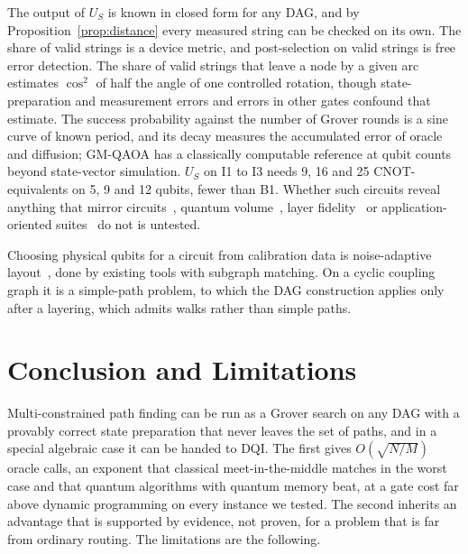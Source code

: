 \documentclass[journal]{IEEEtran}
\begin{document}
The output of $U_{S}$ is known in closed form for any DAG, and by Proposition~\ref{prop:distance} every measured string can be checked on its own. The share of valid strings is a device metric, and post-selection on valid strings is free error detection. The share of valid strings that leave a node by a given arc estimates $\cos^{2}$ of half the angle of one controlled rotation, though state-preparation and measurement errors and errors in other gates confound that estimate. The success probability against the number of Grover rounds is a sine curve of known period, and its decay measures the accumulated error of oracle and diffusion; GM-QAOA has a classically computable reference at qubit counts beyond state-vector simulation. $U_{S}$ on I1 to I3 needs 9, 16 and 25 CNOT-equivalents on 5, 9 and 12 qubits, fewer than B1. Whether such circuits reveal anything that mirror circuits~\cite{proctor2022}, quantum volume~\cite{cross2019}, layer fidelity~\cite{mckay2023} or application-oriented suites~\cite{lubinski2023} do not is untested.

Choosing physical qubits for a circuit from calibration data is noise-adaptive layout~\cite{murali2019,tannu2019,nation2023}, done by existing tools with subgraph matching. On a cyclic coupling graph it is a simple-path problem, to which the DAG construction applies only after a layering, which admits walks rather than simple paths.
\fi

\section{Conclusion and Limitations}
\label{sec:limits}

Multi-constrained path finding can be run as a Grover search on any DAG with a provably correct state preparation that never leaves the set of paths, and in a special algebraic case it can be handed to DQI. The first gives $O(\sqrt{N/M})$ oracle calls, an exponent that classical meet-in-the-middle matches in the worst case and that quantum algorithms with quantum memory beat, at a gate cost far above dynamic programming on every instance we tested. The second inherits an advantage that is supported by evidence, not proven, for a problem that is far from ordinary routing. The limitations are the following.
\end{document}
